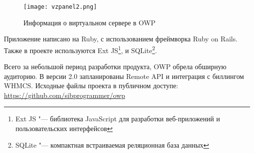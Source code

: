 \begin{figure}[ht]
	\begin{center}
	 	\texttt{[image: vzpanel2.png]}
	 	\caption{Информация о виртуальном сервере в OWP}\label{pic:vzpanel2}
	 \end{center}
\end{figure}

Приложение написано на Ruby, с использованием фреймворка Ruby on Rails. 
Также в проекте используются Ext JS\footnote{Ext JS "--- библиотека JavaScript для разработки веб-приложений и пользовательских интерфейсов}, и SQLite\footnote{SQLite "--- компактная встраиваемая реляционная база данных}. 

Всего за небольшой период разработки продукта, OWP обрела обширную аудиторию.
В версии 2.0 запланированы Remote API и интеграция с биллингом WHMCS.
Исходные файлы проекта в публичном доступе: \url{https://github.com/sibprogrammer/owp}

\clearpage
